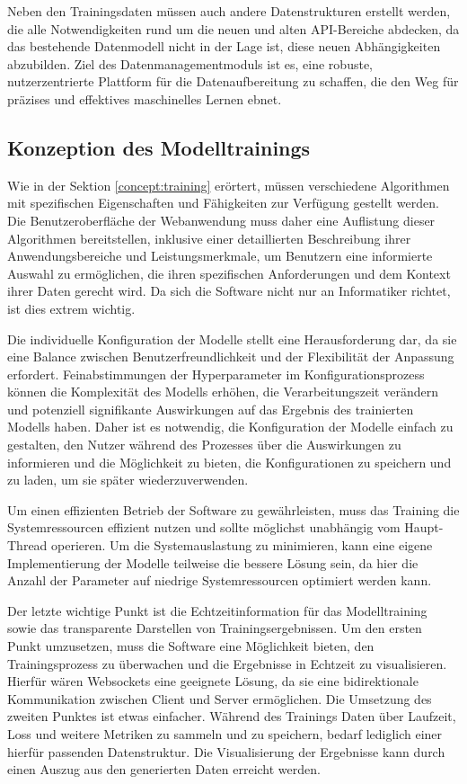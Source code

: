 Neben den Trainingsdaten müssen auch andere Datenstrukturen erstellt werden, die alle Notwendigkeiten rund um die neuen und alten API-Bereiche abdecken, da das bestehende Datenmodell nicht in der Lage ist, 
diese neuen Abhängigkeiten abzubilden. Ziel des Datenmanagementmoduls ist es, eine robuste, nutzerzentrierte Plattform für die Datenaufbereitung zu schaffen, die den Weg für präzises und effektives maschinelles Lernen ebnet.


\subsection{Konzeption des Modelltrainings}
Wie in der Sektion \ref{concept:training} erörtert, müssen verschiedene Algorithmen mit spezifischen Eigenschaften und Fähigkeiten zur Verfügung gestellt werden. Die Benutzeroberfläche der Webanwendung muss daher eine Auflistung dieser Algorithmen bereitstellen, 
inklusive einer detaillierten Beschreibung ihrer Anwendungsbereiche und Leistungsmerkmale, um Benutzern eine informierte Auswahl zu ermöglichen, die ihren spezifischen Anforderungen und dem Kontext ihrer Daten gerecht wird.
Da sich die Software nicht nur an Informatiker richtet, ist dies extrem wichtig.

Die individuelle Konfiguration der Modelle stellt eine Herausforderung dar, da sie eine Balance zwischen Benutzerfreundlichkeit und der Flexibilität der Anpassung erfordert. Feinabstimmungen der Hyperparameter im Konfigurationsprozess
können die Komplexität des Modells erhöhen, die Verarbeitungszeit verändern und potenziell signifikante Auswirkungen auf das Ergebnis des trainierten Modells haben. Daher ist es notwendig, die Konfiguration der Modelle einfach zu gestalten, 
den Nutzer während des Prozesses über die Auswirkungen zu informieren und die Möglichkeit zu bieten, die Konfigurationen zu speichern und zu laden, um sie später wiederzuverwenden.

Um einen effizienten Betrieb der Software zu gewährleisten, muss das Training die Systemressourcen effizient nutzen und sollte möglichst unabhängig vom Haupt-Thread operieren. Um die Systemauslastung zu minimieren, kann eine eigene Implementierung der Modelle teilweise die bessere Lösung sein, 
da hier die Anzahl der Parameter auf niedrige Systemressourcen optimiert werden kann.

Der letzte wichtige Punkt ist die Echtzeitinformation für das Modelltraining sowie das transparente Darstellen von Trainingsergebnissen.
Um den ersten Punkt umzusetzen, muss die Software eine Möglichkeit bieten, den Trainingsprozess zu überwachen und die Ergebnisse in Echtzeit zu visualisieren. Hierfür wären Websockets eine geeignete Lösung, da sie eine bidirektionale Kommunikation zwischen Client und Server ermöglichen.
Die Umsetzung des zweiten Punktes ist etwas einfacher. Während des Trainings Daten über Laufzeit, Loss und weitere Metriken zu sammeln und zu speichern, bedarf lediglich einer hierfür passenden Datenstruktur. Die Visualisierung der Ergebnisse kann durch einen Auszug aus den generierten Daten erreicht werden.


